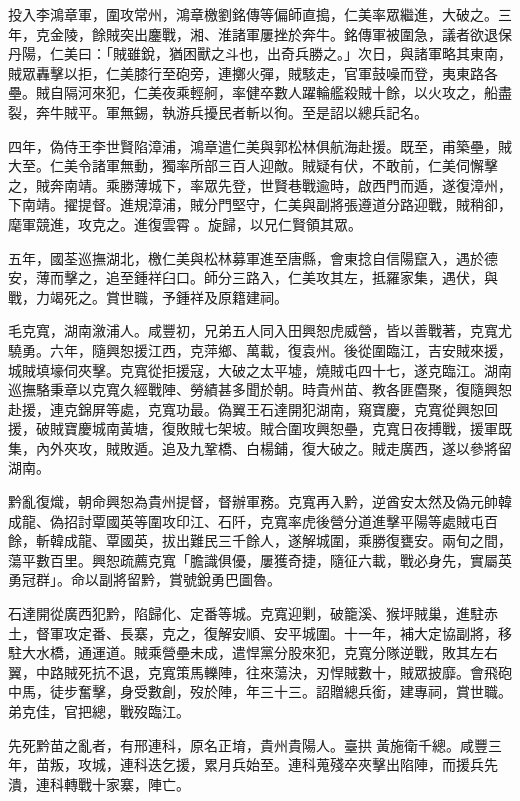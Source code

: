 \begin{pinyinscope}
投入李鴻章軍，圍攻常州，鴻章檄劉銘傳等偏師直搗，仁美率眾繼進，大破之。三年，克金陵，餘賊突出鏖戰，湘、淮諸軍屢挫於奔牛。銘傳軍被圍急，議者欲退保丹陽，仁美曰：「賊雖銳，猶困獸之斗也，出奇兵勝之。」次日，與諸軍略其東南，賊眾轟擊以拒，仁美膝行至砲旁，連擲火彈，賊駭走，官軍鼓噪而登，夷東路各壘。賊自隔河來犯，仁美夜乘輕舸，率健卒數人躍輪艦殺賊十餘，以火攻之，船盡裂，奔牛賊平。軍無錫，執游兵擾民者斬以徇。至是詔以總兵記名。

四年，偽侍王李世賢陷漳浦，鴻章遣仁美與郭松林俱航海赴援。既至，甫築壘，賊大至。仁美令諸軍無動，獨率所部三百人迎敵。賊疑有伏，不敢前，仁美伺懈擊之，賊奔南靖。乘勝薄城下，率眾先登，世賢巷戰逾時，啟西門而遁，遂復漳州，下南靖。擢提督。進規漳浦，賊分門堅守，仁美與副將張遵道分路迎戰，賊稍卻，麾軍競進，攻克之。進復雲霄。旋歸，以兄仁賢領其眾。

五年，國荃巡撫湖北，檄仁美與松林募軍進至唐縣，會東捻自信陽竄入，遇於德安，薄而擊之，追至鍾祥臼口。師分三路入，仁美攻其左，抵羅家集，遇伏，與戰，力竭死之。賞世職，予鍾祥及原籍建祠。

毛克寬，湖南漵浦人。咸豐初，兄弟五人同入田興恕虎威營，皆以善戰著，克寬尤驍勇。六年，隨興恕援江西，克萍鄉、萬載，復袁州。後從圍臨江，吉安賊來援，城賊填壕伺夾擊。克寬從拒援寇，大破之太平墟，燒賊屯四十七，遂克臨江。湖南巡撫駱秉章以克寬久經戰陣、勞績甚多聞於朝。時貴州苗、教各匪麕聚，復隨興恕赴援，連克錦屏等處，克寬功最。偽翼王石達開犯湖南，窺寶慶，克寬從興恕回援，破賊寶慶城南黃塘，復敗賊七架坡。賊合圍攻興恕壘，克寬日夜搏戰，援軍既集，內外夾攻，賊敗遁。追及九鞏橋、白楊鋪，復大破之。賊走廣西，遂以參將留湖南。

黔亂復熾，朝命興恕為貴州提督，督辦軍務。克寬再入黔，逆酋安太然及偽元帥韓成龍、偽招討覃國英等圍攻印江、石阡，克寬率虎後營分道進擊平陽等處賊屯百餘，斬韓成龍、覃國英，拔出難民三千餘人，遂解城圍，乘勝復甕安。兩旬之間，蕩平數百里。興恕疏薦克寬「膽識俱優，屢獲奇捷，隨征六載，戰必身先，實屬英勇冠群」。命以副將留黔，賞號銳勇巴圖魯。

石達開從廣西犯黔，陷歸化、定番等城。克寬迎剿，破籠溪、猴坪賊巢，進駐赤土，督軍攻定番、長寨，克之，復解安順、安平城圍。十一年，補大定協副將，移駐大水橋，通運道。賊乘營壘未成，遣悍黨分股來犯，克寬分隊逆戰，敗其左右翼，中路賊死抗不退，克寬策馬轢陣，往來蕩決，刃悍賊數十，賊眾披靡。會飛砲中馬，徒步奮擊，身受數創，歿於陣，年三十三。詔贈總兵銜，建專祠，賞世職。弟克佳，官把總，戰歿臨江。

先死黔苗之亂者，有邢連科，原名正堉，貴州貴陽人。臺拱黃施衛千總。咸豐三年，苗叛，攻城，連科迭乞援，累月兵始至。連科蒐殘卒夾擊出陷陣，而援兵先潰，連科轉戰十家寨，陣亡。


\end{pinyinscope}
